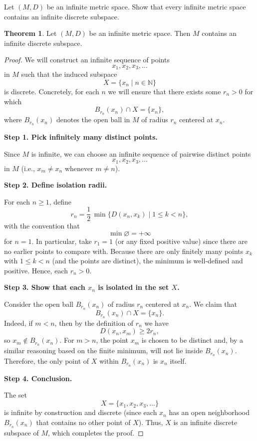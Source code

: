 \documentclass[12pt]{article}
\title{}
\author{Jerich Lee}
\date{\today}
\theoremstyle{definition} %
\newtheorem{theorem}{Theorem}
\theoremstyle{plain} %
\begin{document}
\maketitle

Let $(M, D)$ be an infinite metric space. Show that every infinite metric space contains an infinite discrete subspace.

\begin{theorem}\label{thm:infinite_discrete_subspace}
Let $(M, D)$ be an infinite metric space. Then $M$ contains an infinite discrete subspace.
\end{theorem}

\begin{proof}
We will construct an infinite sequence of points 
\[
x_1, x_2, x_3, \dots 
\]
in $M$ such that the induced subspace 
\[
X = \{ x_n \mid n \in \mathbb{N} \}
\]
is discrete. Concretely, for each $n$ we will ensure that there exists some \( r_n > 0 \) for which
\[
B_{r_n}(x_n) \cap X = \{ x_n \},
\]
where \( B_{r_n}(x_n) \) denotes the open ball in \( M \) of radius \( r_n \) centered at \( x_n \).

\medskip

\noindent \textbf{Step 1. Pick infinitely many distinct points.}

Since \( M \) is infinite, we can choose an infinite sequence of pairwise distinct points 
\[
x_1, x_2, x_3, \dots 
\]
in \( M \) (i.e., \( x_m \neq x_n \) whenever \( m \neq n \)).

\medskip

\noindent \textbf{Step 2. Define isolation radii.}

For each \( n \ge 1 \), define
\[
r_n = \frac{1}{2}\,\min\{ D(x_n,x_k) \mid 1 \le k < n \},
\]
with the convention that 
\[
\min \varnothing = +\infty
\]
for \( n=1 \). In particular, take \( r_1 = 1 \) (or any fixed positive value) since there are no earlier points to compare with. Because there are only finitely many points \( x_k \) with \( 1 \le k < n \) (and the points are distinct), the minimum is well‑defined and positive. Hence, each \( r_n > 0 \).

\medskip

\noindent \textbf{Step 3. Show that each \( x_n \) is isolated in the set \( X \).}

Consider the open ball \( B_{r_n}(x_n) \) of radius \( r_n \) centered at \( x_n \). We claim that
\[
B_{r_n}(x_n) \cap X = \{ x_n \}.
\]
Indeed, if \( m < n \), then by the definition of \( r_n \) we have
\[
D(x_n,x_m) \ge 2r_n,
\]
so \( x_m \not\in B_{r_n}(x_n) \). For \( m > n \), the point \( x_m \) is chosen to be distinct and, by a similar reasoning based on the finite minimum, will not lie inside \( B_{r_n}(x_n) \). Therefore, the only point of \( X \) within \( B_{r_n}(x_n) \) is \( x_n \) itself.

\medskip

\noindent \textbf{Step 4. Conclusion.}

The set
\[
X = \{ x_1, x_2, x_3, \dots \}
\]
is infinite by construction and discrete (since each \( x_n \) has an open neighborhood \( B_{r_n}(x_n) \) that contains no other point of \( X \)). Thus, \( X \) is an infinite discrete subspace of \( M \), which completes the proof.
\end{proof}
\end{document}
